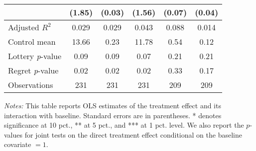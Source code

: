 \begin{table}[ht]
{\begin{threeparttable}
\begin{tabular}{l*{5}{c}}
                &   (1.85)         &   (0.03)         &   (1.56)         &   (0.07)         &   (0.04)         \\
\midrule
Adjusted \(R^{2}\)&    0.029         &    0.029         &    0.043         &    0.088         &    0.014         \\
Control mean    &    13.66         &     0.23         &    11.78         &     0.54         &     0.12         \\
Lottery \emph{p}-value&     0.09         &     0.09         &     0.07         &     0.21         &     0.21         \\
Regret \emph{p}-value&     0.02         &     0.02         &     0.02         &     0.33         &     0.17         \\
Observations    &      231         &      231         &      231         &      209         &      209         \\
\bottomrule \end{tabular} \begin{tablenotes}[flushleft] \footnotesize \item \emph{Notes:} This table reports OLS estimates of the treatment effect and its interaction with baseline. Standard errors are in parentheses. * denotes significance at 10 pct., ** at 5 pct., and *** at 1 pct. level. We also report the \(p\)-values for joint tests on the direct treatment effect conditional on the baseline covariate $= 1$. \end{tablenotes} \end{threeparttable} } \end{table}

